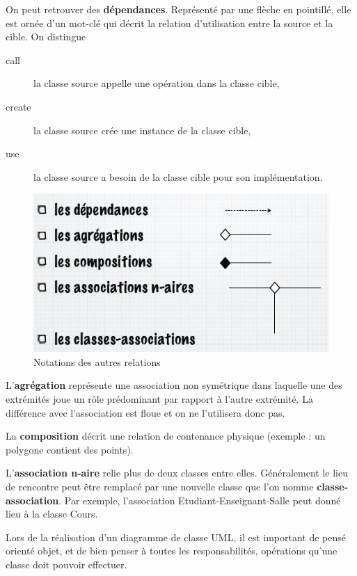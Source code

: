 On peut retrouver des \textbf{dépendances}.
Représenté par une flèche en pointillé,
elle est ornée d'un mot-clé qui décrit la relation
d'utilisation entre la source et la cible.
On distingue
\begin{description}
  \item[call]
    la classe source appelle une opération dans la classe cible,
  \item[create]
    la classe source crée une instance de la classe cible,
  \item[use]
    la classe source a besoin de la classe cible pour son implémentation.
\end{description}

\begin{figure}[h]
  \centering
  \includegraphics[scale=0.6]{diagramme_classes_relations}
  \caption{Notations des autres relations}
  \label{diagramme_classes_relations}
\end{figure}

L'\textbf{agrégation} représente une association non symétrique dans laquelle
une des extrémités joue un rôle prédominant par rapport à l'autre extrémité.
La différence avec l'association est floue et on ne l'utilisera donc pas.

La \textbf{composition} décrit une relation de contenance
physique (exemple : un polygone contient des points).

L'\textbf{association n-aire} relie plus de deux classes entre elles.
Généralement le lieu de rencontre peut être remplacé par une nouvelle
classe que l'on nomme \textbf{classe-association}.
Par exemple,
l'association Etudiant-Enseignant-Salle peut donné lieu à la classe Cours.

Lors de la réalisation d'un diagramme de classe UML,
il est important de pensé orienté objet,
et de bien penser à toutes les responsabilités,
opérations qu'une classe doit pouvoir effectuer.

